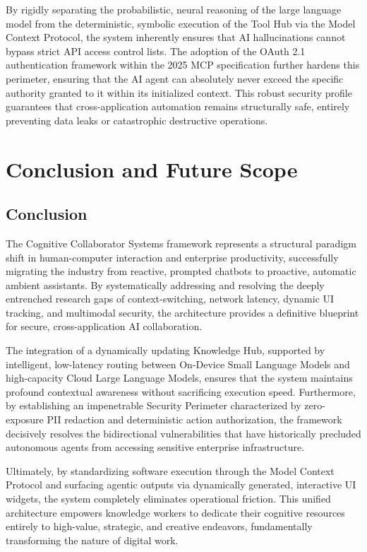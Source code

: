 \documentclass[12pt, a4paper]{report}
\begin{document}
By rigidly separating the probabilistic, neural reasoning of the large language model from the deterministic, symbolic execution of the Tool Hub via the Model Context Protocol, the system inherently ensures that AI hallucinations cannot bypass strict API access control lists.\cite{hojo2025} The adoption of the OAuth 2.1 authentication framework within the 2025 MCP specification further hardens this perimeter, ensuring that the AI agent can absolutely never exceed the specific authority granted to it within its initialized context.\cite{redpilllabs2026} This robust security profile guarantees that cross-application automation remains structurally safe, entirely preventing data leaks or catastrophic destructive operations.\cite{hojo2025}


\chapter{Conclusion and Future Scope}

\section{Conclusion}
The Cognitive Collaborator Systems framework represents a structural paradigm shift in human-computer interaction and enterprise productivity, successfully migrating the industry from reactive, prompted chatbots to proactive, automatic ambient assistants.\cite{hojo2025} By systematically addressing and resolving the deeply entrenched research gaps of context-switching, network latency, dynamic UI tracking, and multimodal security, the architecture provides a definitive blueprint for secure, cross-application AI collaboration.\cite{hojo2025}

The integration of a dynamically updating Knowledge Hub, supported by intelligent, low-latency routing between On-Device Small Language Models and high-capacity Cloud Large Language Models, ensures that the system maintains profound contextual awareness without sacrificing execution speed.\cite{hojo2025} Furthermore, by establishing an impenetrable Security Perimeter characterized by zero-exposure PII redaction and deterministic action authorization, the framework decisively resolves the bidirectional vulnerabilities that have historically precluded autonomous agents from accessing sensitive enterprise infrastructure.\cite{hojo2025}

Ultimately, by standardizing software execution through the Model Context Protocol and surfacing agentic outputs via dynamically generated, interactive UI widgets, the system completely eliminates operational friction. This unified architecture empowers knowledge workers to dedicate their cognitive resources entirely to high-value, strategic, and creative endeavors, fundamentally transforming the nature of digital work.\cite{hojo2025}
\end{document}
